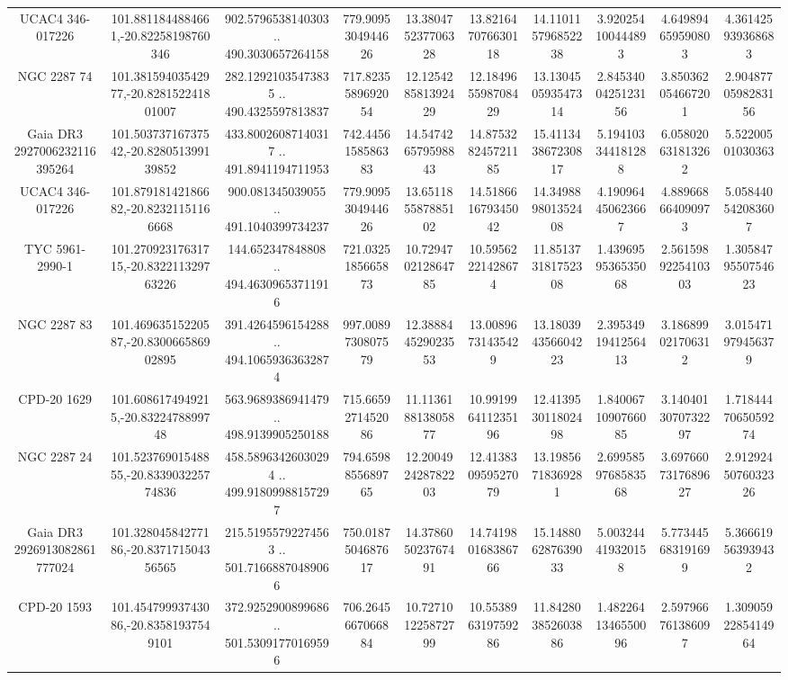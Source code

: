 \begin{table}
\begin{tabular}{cccccccccc}
UCAC4 346-017226 & 101.8811844884661,-20.82258198760346 & 902.5796538140303 .. 490.3030657264158 & 779.9095304944626 & 13.380475237706328 & 13.821647076630118 & 14.110115796852238 & 3.920254100444893 & 4.649894659590803 & 4.361425939368683 \\
NGC  2287    74 & 101.38159403542977,-20.828152241801007 & 282.12921035473835 .. 490.4325597813837 & 717.8235589692054 & 12.125428581392429 & 12.184965598708429 & 13.130450593547314 & 2.8453400425123156 & 3.850362054667201 & 2.9048770598283156 \\
Gaia DR3 2927006232116395264 & 101.50373716737542,-20.828051399139852 & 433.80026087140317 .. 491.8941194711953 & 742.4456158586383 & 14.547426579598843 & 14.875328245721185 & 15.411343867230817 & 5.194103344181288 & 6.058020631813262 & 5.52200501030363 \\
UCAC4 346-017226 & 101.87918142186682,-20.82321151166668 & 900.081345039055 .. 491.1040399734237 & 779.9095304944626 & 13.651185587885102 & 14.518661679345042 & 14.349889801352408 & 4.190964450623667 & 4.889668664090973 & 5.058440542083607 \\
TYC 5961-2990-1 & 101.27092317631715,-20.832211329763226 & 144.652347848808 .. 494.46309653711916 & 721.0325185665873 & 10.729470212864785 & 10.59562221428674 & 11.851373181752308 & 1.4396959536535068 & 2.5615989225410303 & 1.3058479550754623 \\
NGC  2287    83 & 101.46963515220587,-20.830066586902895 & 391.4264596154288 .. 494.10659363632874 & 997.0089730807579 & 12.388844529023553 & 13.00896731435429 & 13.180394356604223 & 2.3953491941256413 & 3.186899021706312 & 3.015471979456379 \\
CPD-20  1629 & 101.6086174949215,-20.8322478899748 & 563.9689386941479 .. 498.9139905250188 & 715.6659271452086 & 11.113618813805877 & 10.991996411235196 & 12.413953011802498 & 1.8400671090766085 & 3.1404013070732297 & 1.7184447065059274 \\
NGC  2287    24 & 101.52376901548855,-20.833903225774836 & 458.58963426030294 .. 499.91809988157297 & 794.6598855689765 & 12.200492428782203 & 12.413830959527079 & 13.19856718369281 & 2.6995859768583568 & 3.6976607317689627 & 2.9129245076032326 \\
Gaia DR3 2926913082861777024 & 101.32804584277186,-20.837171504356565 & 215.51955792274563 .. 501.71668870489066 & 750.0187504687617 & 14.378605023767491 & 14.741980168386766 & 15.148806287639033 & 5.003244419320158 & 5.773445683191699 & 5.366619563939432 \\
CPD-20  1593 & 101.45479993743086,-20.83581937549101 & 372.9252900899686 .. 501.53091770169596 & 706.2645667066884 & 10.727101225872799 & 10.553896319759286 & 11.842803852603886 & 1.4822641346550096 & 2.597966761386097 & 1.3090592285414964 \\

\end{tabular}
\end{table}
